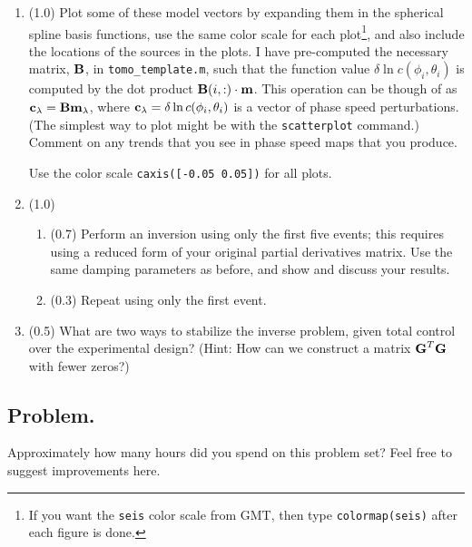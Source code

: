 \documentclass[11pt,titlepage,fleqn]{article}
\begin{document}
\begin{enumerate}
\item (1.0) Plot some of these model vectors by expanding them in the spherical spline basis functions, use the same color scale for each plot\footnote{If you want the {\tt seis} color scale from GMT, then type {\tt colormap(seis)} after each figure is done.}, and also include the locations of the sources in the plots. I have pre-computed the necessary matrix, $\mbox{${\bf B}$}$, in \verb+tomo_template.m+, such that the function value $\delta\ln c(\phi_i, \theta_i)$ is computed by the dot product $\mbox{${\bf B}$}(i,:) \cdot \mbox{${\bf m}$}$. This operation can be though of as $\mbox{${\bf c}$}_{\lambda} = \mbox{${\bf B}$} \mbox{${\bf m}$}_{\lambda}$, where $\mbox{${\bf c}$}_{\lambda} = \delta\ln c(\phi_i, \theta_i)$ is a vector of phase speed perturbations. (The simplest way to plot might be with the \verb+scatterplot+ command.) Comment on any trends that you see in phase speed maps that you produce.

Use the color scale \verb+caxis([-0.05 0.05])+ for all plots.

\item (1.0)
%
\begin{enumerate}
\item (0.7) Perform an inversion using only the first five events; this requires using a reduced form of your original partial derivatives matrix. Use the same damping parameters as before, and show and discuss your results.

\item (0.3) Repeat using only the first event.
\end{enumerate}

\item (0.5) What are two ways to stabilize the inverse problem, given total control over the experimental design?  (Hint: How can we construct a matrix $\mbox{${\bf G}$}^T\mbox{${\bf G}$}$ with fewer zeros?)

\end{enumerate}


\subsection*{Problem.}

Approximately how many hours did you spend on this problem set? Feel free to suggest improvements here.



\end{document}

